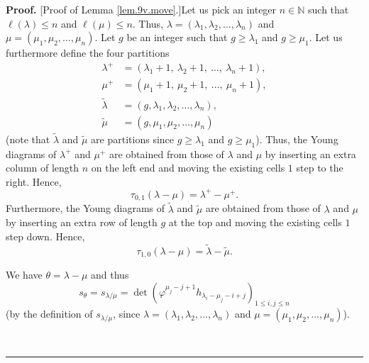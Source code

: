 \documentclass[numbers=enddot,12pt,final,onecolumn,notitlepage]{scrartcl}%
\theoremstyle{definition}
\newenvironment{proof}[1][Proof]{\noindent\textbf{#1.} }{\ \rule{0.5em}{0.5em}}
\begin{document}
\begin{enumerate}
\begin{proof}
[Proof of Lemma \ref{lem.9v.move}.]Let us pick an integer $n\in\mathbb{N}$
such that $\ell\left(  \lambda\right)  \leq n$ and $\ell\left(  \mu\right)
\leq n$. Thus, $\lambda=\left(  \lambda_{1},\lambda_{2},\ldots,\lambda
_{n}\right)  $ and $\mu=\left(  \mu_{1},\mu_{2},\ldots,\mu_{n}\right)  $. Let
$g$ be an integer such that $g\geq\lambda_{1}$ and $g\geq\mu_{1}$. Let us
furthermore define the four partitions%
\begin{align*}
\lambda^{+}  &  =\left(  \lambda_{1}+1,\ \lambda_{2}+1,\ \ldots,\ \lambda
_{n}+1\right)  ,\\
\mu^{+}  &  =\left(  \mu_{1}+1,\ \mu_{2}+1,\ \ldots,\ \mu_{n}+1\right)  ,\\
\widetilde{\lambda}  &  =\left(  g,\lambda_{1},\lambda_{2},\ldots,\lambda
_{n}\right)  ,\\
\widetilde{\mu}  &  =\left(  g,\mu_{1},\mu_{2},\ldots,\mu_{n}\right)
\end{align*}
(note that $\widetilde{\lambda}$ and $\widetilde{\mu}$ are partitions since
$g\geq\lambda_{1}$ and $g\geq\mu_{1}$). Thus, the Young diagrams of
$\lambda^{+}$ and $\mu^{+}$ are obtained from those of $\lambda$ and $\mu$ by
inserting an extra column of length $n$ on the left end and moving the
existing cells $1$ step to the right. Hence,
\[
\tau_{0,1}\left(  \lambda-\mu\right)  =\lambda^{+}-\mu^{+}.
\]
Furthermore, the Young diagrams of $\widetilde{\lambda}$ and $\widetilde{\mu}$
are obtained from those of $\lambda$ and $\mu$ by inserting an extra row of
length $g$ at the top and moving the existing cells $1$ step down. Hence,
\[
\tau_{1,0}\left(  \lambda-\mu\right)  =\widetilde{\lambda}-\widetilde{\mu}.
\]


We have $\theta=\lambda-\mu$ and thus%
\begin{equation}
s_{\theta}=s_{\lambda/\mu}=\det\left(  \varphi^{\mu_{j}-j+1}h_{\lambda_{i}%
-\mu_{j}-i+j}\right)  _{1\leq i,j\leq n} \label{pf.lem.9v.move.slm}%
\end{equation}
(by the definition of $s_{\lambda/\mu}$, since $\lambda=\left(  \lambda
_{1},\lambda_{2},\ldots,\lambda_{n}\right)  $ and $\mu=\left(  \mu_{1},\mu
_{2},\ldots,\mu_{n}\right)  $).


\end{proof}
\end{enumerate}
\end{document}
